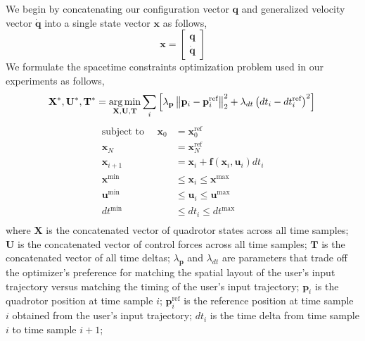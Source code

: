 We begin by concatenating our configuration vector $\mathbf{q}$ and generalized velocity vector $\dot{\mathbf{q}}$ into a single state vector $\mathbf{x}$ as follows,
%
\footnotesize
\begin{equation}
\mathbf{x} = 
\begin{bmatrix}
\mathbf{q} \\
\dot{\mathbf{q}}
\end{bmatrix}
\end{equation}
\normalsize
%
We formulate the spacetime constraints optimization problem used in our experiments as follows,
%
\footnotesize
\begin{equation*}
\mathbf{X}^{*},\mathbf{U}^{*},\mathbf{T}^* = \operatorname*{arg\,min}_{\mathbf{X},\mathbf{U},\mathbf{T}} \sum_i \left[\lambda_\mathbf{p} \left\Vert \mathbf{p}_i - \mathbf{p}_i^{\text{ref}} \right\Vert_2^2 + \lambda_{dt} \left(dt_i - dt_i^{\text{ref}} \right)^2\right]\\
\end{equation*}
%
\begin{equation}
\begin{aligned}
\text{subject to~~~~}
\mathbf{x}_{0}   & = \mathbf{x}_{0}^{\text{ref}}\\
\mathbf{x}_{N}   & = \mathbf{x}_{N}^{\text{ref}}\\
\mathbf{x}_{i+1} & = \mathbf{x}_{i} +\mathbf{f}(\mathbf{x}_{i},\mathbf{u}_{i})dt_i\\
\mathbf{x}^{\text{min}}  & \leq \mathbf{x}_i  \leq \mathbf{x}^{\text{max}}\\
\mathbf{u}^{\text{min}}  & \leq \mathbf{u}_i  \leq \mathbf{u}^{\text{max}}\\
dt^{\text{min}}          & \leq dt_i          \leq dt^{\text{max}}\\
\end{aligned}
\label{eqn:spacetime}
\end{equation}
\normalsize
%
where
$\mathbf{X}$ is the concatenated vector of quadrotor states across all time samples;
$\mathbf{U}$ is the concatenated vector of control forces across all time samples;
$\mathbf{T}$ is the concatenated vector of all time deltas;
$\lambda_\mathbf{p}$ and $\lambda_{dt}$ are parameters that trade off the optimizer's preference for matching the spatial layout of the user's input trajectory versus matching the timing of the user's input trajectory;
$\mathbf{p}_i$ is the quadrotor position at time sample $i$;
$\mathbf{p}_i^{\text{ref}}$ is the reference position at time sample $i$ obtained from the user's input trajectory;
$dt_i$ is the time delta from time sample $i$ to time sample $i+1$; 
